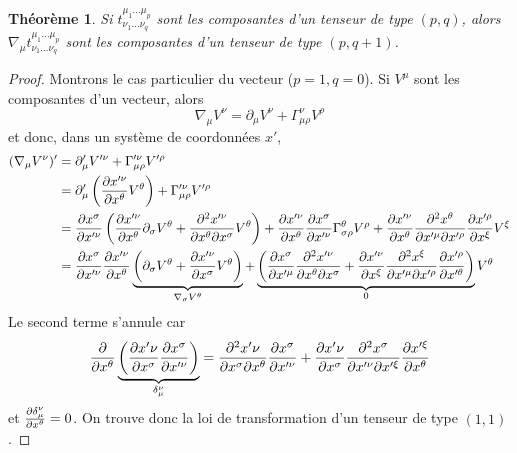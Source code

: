 \documentclass[a4paper,11pt]{report}
\theoremstyle{definition}
\theoremstyle{plain}
\newtheorem{thm}{Théorème}[chapter]
\theoremstyle{definition}
\theoremstyle{remark}
\newcommand{\p}{\partial}
\begin{document}
                \begin{thm}
                    Si $t^{\mu_1\dots\mu_p}_{\nu_1\dots\nu_q}$ sont les composantes d'un tenseur de type $(p,q)$, alors $\nabla_\mu t^{\mu_1\dots\mu_p}_{\nu_1\dots\nu_q}$ sont les composantes d'un tenseur de type $(p,q+1)$.
                \end{thm}
                
                \begin{proof}
                    Montrons le cas particulier du vecteur ($p=1,q=0$). Si $V^\mu$ sont les composantes d'un vecteur, alors
                    \begin{equation}
                        \nabla_\mu V^\nu = \p_\mu V^\nu + \Gamma^\nu_{\mu\rho} V^\rho
                    \end{equation}
                    et donc, dans un système de coordonnées $x'$, 
                    \begin{align}
                        (\nabla_\mu V^\nu)' &= \p'_\mu V'^\nu + \Gamma'^\nu_{\mu\rho} V'^\rho \\
                        &= \p'_\mu\left( \pdv{x'^\nu}{x^\theta} V^\theta\right) + \Gamma'^\nu_{\mu\rho} V'^\rho\\
                        &= \pdv{x^\sigma}{x'^\nu}\left( \pdv{x'^\nu}{x^\theta}\p_\sigma V^\theta + \pdv{x'^\nu}{x^\theta}{x^\sigma} V^\theta \right) + \pdv{x'^\nu}{x^\theta}\pdv{x^\sigma}{x'^\nu}\Gamma^\theta_{\sigma\rho} V^\rho + \pdv{x'^\nu}{x^\theta}\pdv{x^\theta}{x'^\mu}{x'^\rho}\pdv{x'^\rho}{x^\xi} V^\xi\\
                        &=  \pdv{x^\sigma}{x'^\nu} \pdv{x'^\nu}{x^\theta}\underbrace{\left(\p_\sigma V^\theta + \pdv{x'^\nu}{x^\sigma} V^\theta \right)}_{\nabla_\sigma V^\theta}+\underbrace{\left( \pdv{x^\sigma}{x'^\mu}\pdv{x'^\nu}{x^\theta}{x^\sigma}+\pdv{x'^\nu}{x^\xi}\pdv{x^\xi}{x'^\mu}{x'^\rho}\pdv{x'^\rho}{x'^\theta} \right)}_{0}V^\theta
                    \end{align}
                    Le second terme s'annule car
                    \begin{equation}
                        \pdv{}{x^\theta}\underbrace{\left( \pdv{x'\nu}{x^\sigma}\pdv{x^\sigma}{x'^\nu} \right)}_{\delta^\nu_\mu} = \pdv{x'\nu}{x^\sigma}{x^\theta}\pdv{x^\sigma}{x'^\nu} + \pdv{x'\nu}{x^\sigma}\pdv{x^\sigma}{x'^\nu}{x'^\xi}\pdv{x'^\xi}{x^\theta}
                    \end{equation}
                    et $ \pdv{\delta^\nu_\mu}{x^\theta} = 0$. On trouve donc la loi de transformation d'un tenseur de type $(1,1)$.
                \end{proof}
                
\end{document}
